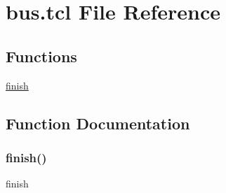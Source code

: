 \hypertarget{bus_8tcl}{}\section{bus.\+tcl File Reference}
\label{bus_8tcl}
\subsection*{Functions}
\begin{DoxyCompactItemize}
\item 
\hyperlink{bus_8tcl_a30728837c246b65ef76298af0101d99c}{finish}
\end{DoxyCompactItemize}


\subsection{Function Documentation}
\mbox{\label{bus_8tcl_a30728837c246b65ef76298af0101d99c}} 
\subsubsection{\texorpdfstring{finish()}{finish()}}
{\footnotesize\ttfamily finish}

